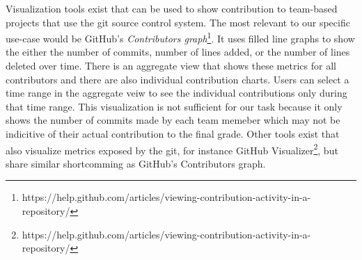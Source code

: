 \documentclass[../manifest.tex]{subfiles}
\begin{document}
Visualization tools exist that can be used to show contribution to team-based projects that use the git source control system. The most relevant to our specific use-case would be GitHub's \textit{Contributors graph}\footnote{https://help.github.com/articles/viewing-contribution-activity-in-a-repository/}. It uses filled line graphs to show the either the number of commits, number of lines added, or the number of lines deleted over time. There is an aggregate view that shows these metrics for all contributors and there are also individual contribution charts. Users can select a time range in the aggregate veiw to see the individual contributions only during that time range. This visualization is not sufficient for our task because it only shows the number of commits made by each team memeber which may not be indicitive of their actual contribution to the final grade. Other tools exist that also visualize metrics exposed by the git, for instance GitHub Visualizer\footnote{https://help.github.com/articles/viewing-contribution-activity-in-a-repository/}, but share similar shortcomming as GitHub's Contributors graph.
\end{document}
